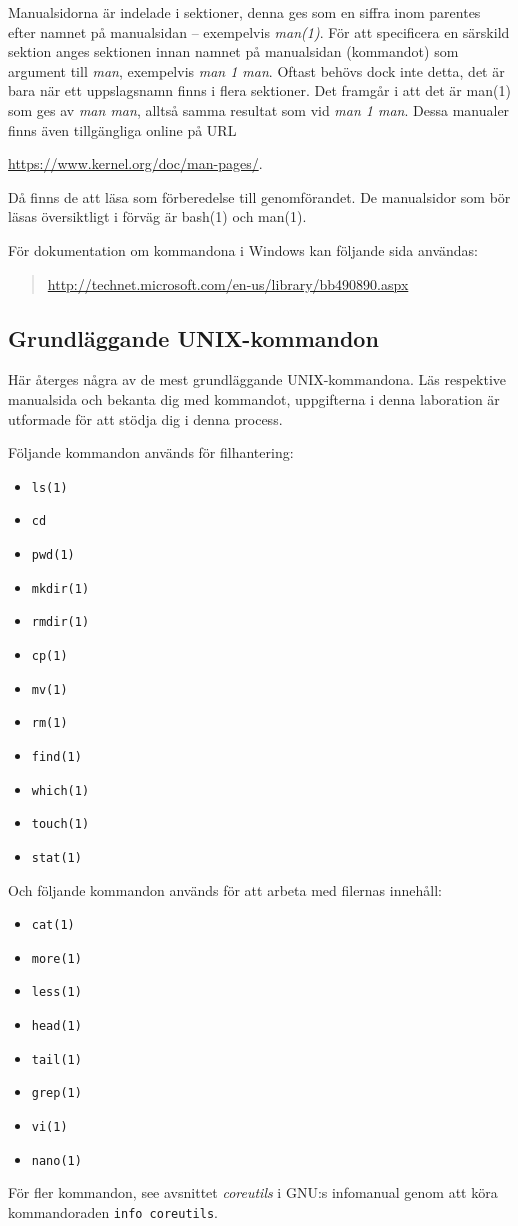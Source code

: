 Manualsidorna är indelade i sektioner, denna ges som en siffra inom parentes 
efter namnet på manualsidan -- exempelvis \emph{man(1)}.
För att specificera en särskild sektion anges sektionen innan namnet på 
manualsidan (kommandot) som argument till \emph{man}, exempelvis \emph{man 
1 man}.
Oftast behövs dock inte detta, det är bara när ett uppslagsnamn finns i flera 
sektioner.
Det framgår i  att det är man(1) som ges av \emph{man 
man}, alltså samma resultat som vid \emph{man 1 man}.
Dessa manualer finns även tillgängliga online på URL
\begin{center}
	\url{https://www.kernel.org/doc/man-pages/}.
\end{center}
Då finns de att läsa som förberedelse till genomförandet.
De manualsidor som bör läsas översiktligt i förväg är bash(1) och man(1).

För dokumentation om kommandona i Windows kan följande sida användas:
\begin{quote}
	\url{http://technet.microsoft.com/en-us/library/bb490890.aspx}
\end{quote}

\subsection{Grundläggande UNIX-kommandon}
Här återges några av de mest grundläggande UNIX-kommandona.
Läs respektive manualsida och bekanta dig med kommandot, uppgifterna i denna 
laboration är utformade för att stödja dig i denna process.

Följande kommandon används för filhantering:
\begin{itemize}
  \item \texttt{ls(1)}
  \item \texttt{cd}
  \item \texttt{pwd(1)}
  \item \texttt{mkdir(1)}
  \item \texttt{rmdir(1)}
  \item \texttt{cp(1)}
  \item \texttt{mv(1)}
  \item \texttt{rm(1)}
  \item \texttt{find(1)}
  \item \texttt{which(1)}
  \item \texttt{touch(1)}
  \item \texttt{stat(1)}
\end{itemize}

Och följande kommandon används för att arbeta med filernas innehåll:
\begin{itemize}
  \item \texttt{cat(1)}
  \item \texttt{more(1)}
  \item \texttt{less(1)}
  \item \texttt{head(1)}
  \item \texttt{tail(1)}
  \item \texttt{grep(1)}
  \item \texttt{vi(1)}
  \item \texttt{nano(1)}
\end{itemize}

För fler kommandon, see avsnittet \emph{coreutils} i GNU:s infomanual genom att 
köra kommandoraden \texttt{info coreutils}.

